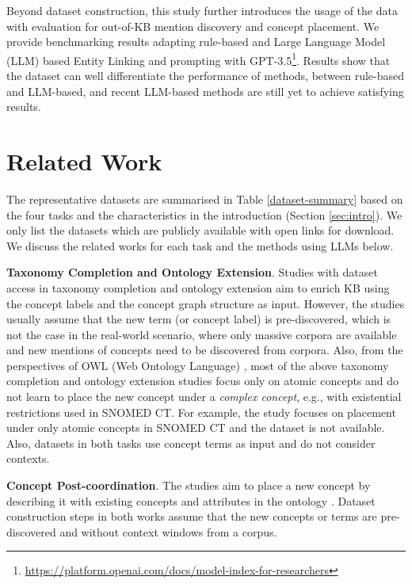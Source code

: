 \documentclass[sigconf]{acmart}
\begin{document}
Beyond dataset construction, this study further introduces the usage of the data with evaluation for out-of-KB mention discovery and concept placement. We provide benchmarking results adapting rule-based and Large Language Model (LLM) based Entity Linking \cite{dong2023NIL,wu2020blink} and prompting with GPT-3.5\footnote{\url{https://platform.openai.com/docs/model-index-for-researchers}}. Results show that the dataset can well differentiate the performance of methods, between rule-based and LLM-based, and recent LLM-based methods are still yet to achieve satisfying results.

\section{Related Work}
The representative datasets are summarised in Table \ref{dataset-summary} based on the four tasks and the characteristics in the introduction (Section \ref{sec:intro}). We only list the datasets which are publicly available with open links for download. We discuss the related works for each task and the methods using LLMs below.

\noindent\textbf{Taxonomy Completion and Ontology Extension}. Studies with dataset access in taxonomy completion \cite{Wang2022QEN,Zeng2021,zhang2021TMN,Shen2020TaxoExpan,jurgens-pilehvar-2016-semeval} and ontology extension \cite{glauer2022interpretable} aim to enrich KB using the concept labels and the concept graph structure as input. However, the studies usually assume that the new term (or concept label) is pre-discovered, which is not the case in the real-world scenario, where only massive corpora are available and new mentions of concepts need to be discovered from corpora. Also, from the perspectives of OWL (Web Ontology Language) \cite{GRAU2008OWL2,baader_horrocks_lutz_sattler_2017chap8}, 
most of the above taxonomy completion and ontology extension studies focus only on atomic concepts and do not learn to place the new concept under a \textit{complex concept}, e.g., with existential restrictions used in  SNOMED CT. For example, the study \cite{Liu2020placement} focuses on placement under only atomic concepts in SNOMED CT and the dataset is not available. Also, datasets in both tasks use concept terms as input and do not consider contexts.

\noindent\textbf{Concept Post-coordination}. 
The studies aim to place a new concept by describing it with existing concepts and attributes in the ontology \cite{kate2020,castell2023postcoordination}. %
Dataset construction steps in both works \cite{kate2020,castell2023postcoordination} assume that the new concepts or terms are pre-discovered and without context windows from a corpus. 
\end{document}
